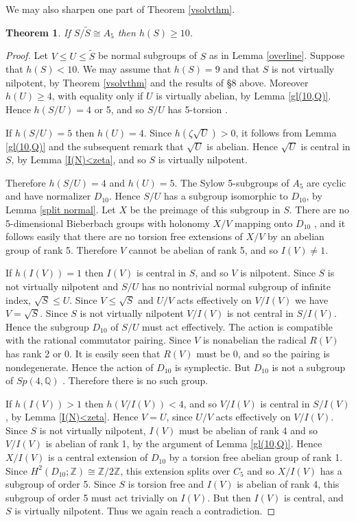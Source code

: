 \documentclass[12pt]{amsart}
\renewcommand{\geq}{\geqslant}
\renewcommand{\leq}{\leqslant}
\newtheorem{theorem}{Theorem}
\begin{document}
We may also sharpen one part of Theorem \ref{vsolvthm}.

\begin{theorem}
\label{A5h>9}
If $S/\widetilde{S}\cong{A_5}$ then $h(S)\geq10$.
\end{theorem}

\begin{proof}
Let $V\leq{U}\leq\widetilde{S}$ be normal subgroups of $S$ 
as in Lemma \ref{overline}.
Suppose that $h(S)<10$. 
We may assume that $h(S)=9$ and that $S$ is not virtually nilpotent, 
by Theorem \ref{vsolvthm} and the results of \S8 above.
Moreover $h(U)\geq4$, with equality only if $U$ is virtually abelian,
by Lemma \ref{gl(10,Q)}.
Hence $h(S/U)=4$ or 5,  and so $S/U$ has 5-torsion \cite{Lu23}.

If $h(S/U)=5$ then $h(U)=4$.
Since $h(\zeta\sqrt{U})>0$,  
it follows from Lemma \ref{gl(10,Q)} and the subsequent remark 
that $\sqrt{U}$ is abelian.
Hence $\sqrt{U}$ is central in $S$,
by Lemma \ref{I(N)<zeta}, and so $S$ is virtually nilpotent.

Therefore $h(S/U)=4$ and $h(U)=5$.
The Sylow 5-subgroups of $A_5$ are cyclic and have normalizer $D_{10}$.
Hence $S/U$ has a subgroup isomorphic to $D_{10}$, 
by Lemma \ref{split normal}.
Let $X$ be the preimage of this subgroup in $S$.
There are no  5-dimensional Bieberbach groups with holonomy $X/V$
mapping onto $D_{10}$ \cite{CS},
and it follows easily that there are no torsion free extensions of 
$X/V$ by an abelian group of rank 5.
Therefore $V$ cannot be abelian of rank 5, and so $I(V)\not=1$.

If $h(I(V))=1$ then $I(V)$ is central in $S$,  and so $V$ is nilpotent.
Since $S$ is not virtually nilpotent and $S/U$ has no nontrivial normal subgroup
of infinite index,  $\sqrt{S}\leq{U}$.
Since $V\leq\sqrt{S}$ and $U/V$ acts effectively on $V/I(V)$ we have $V=\sqrt{S}$.
Since $S$ is not virtually nilpotent $V/I(V)$ is not central in $S/I(V)$.
Hence the subgroup $D_{10}$ of $S/U$ must act effectively.
The action is compatible with the rational commutator pairing.
Since $V$ is nonabelian the radical $R(V)$ has rank 2 or 0.
It is easily seen that $R(V)$ must be 0, and so the pairing is nondegenerate.
Hence the action of $D_{10}$ is symplectic.
But $D_{10}$ is not a subgroup of  $Sp(4,\mathbb{Q})$ \cite[Chapter 4]{Ki}.
Therefore there is no such group.

If $h(I(V))>1$ then $h(V/I(V))<4$,
and so $V/I(V)$ is central in $S/I(V)$, by Lemma \ref{I(N)<zeta}.
Hence $V=U$, since $U/V$ acts effectively on $V/I(V)$.
Since $S$ is not virtually nilpotent, 
$I(V)$ must be abelian of rank 4 and so $V/I(V)$ is abelian of rank 1,
by the argument of Lemma \ref{gl(10,Q)}.
Hence $X/I(V)$ is a central extension of $D_{10}$ by a torsion free abelian group 
of rank 1.
Since $H^2(D_{10};\mathbb{Z})\cong\mathbb{Z}/2\mathbb{Z}$, 
this extension splits over $C_5$ and so $X/I(V)$ has a subgroup of order 5.
Since $S$ is torsion free and $I(V)$ is abelian of rank 4, 
this subgroup of order 5 must act trivially on $I(V)$.
But then $I(V)$ is central, and $S$ is virtually nilpotent.
Thus we again reach a contradiction.
\end{proof}
\end{document}
